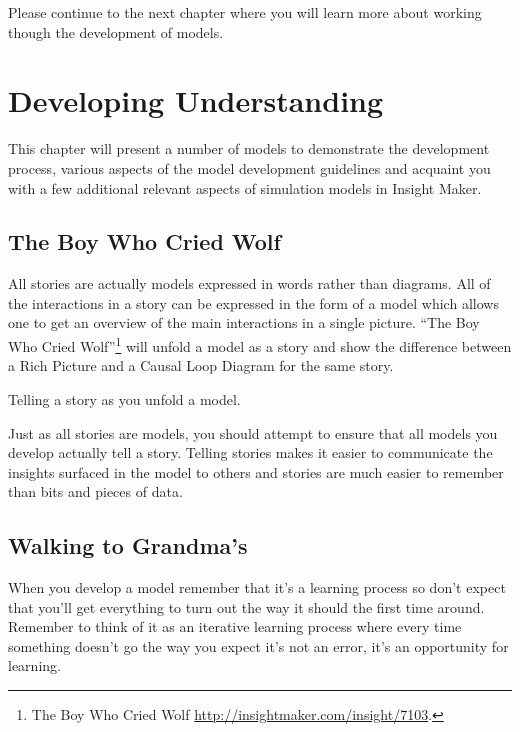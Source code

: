 \documentclass[]{memoir}
\begin{document}
Please continue to the next chapter where you will learn more about
working though the development of models.

\chapter{Developing Understanding}

This chapter will present a number of models to demonstrate the
development process, various aspects of the model development guidelines
and acquaint you with a few additional relevant aspects of simulation
models in Insight Maker.

\section{The Boy Who Cried Wolf}

All stories are actually models expressed in words rather than diagrams.
All of the interactions in a story can be expressed in the form of a
model which allows one to get an overview of the main interactions in a
single picture. ``The Boy Who Cried Wolf''\footnote{The Boy Who Cried
  Wolf \url{http://insightmaker.com/insight/7103}.} will unfold a model
as a story and show the difference between a Rich Picture and a Causal
Loop Diagram for the same story.

\FloatBarrier 

\begin{model}[frametitle={Model: The Boy Who Cried Wolf}] 

 Telling a story as you unfold a model.




 \end{model}

Just as all stories are models, you should attempt to ensure that all
models you develop actually tell a story. Telling stories makes it
easier to communicate the insights surfaced in the model to others and
stories are much easier to remember than bits and pieces of data.

\section{Walking to Grandma's}

When you develop a model remember that it's a learning process so don't
expect that you'll get everything to turn out the way it should the
first time around. Remember to think of it as an iterative learning
process where every time something doesn't go the way you expect it's
not an error, it's an opportunity for learning.
\end{document}
